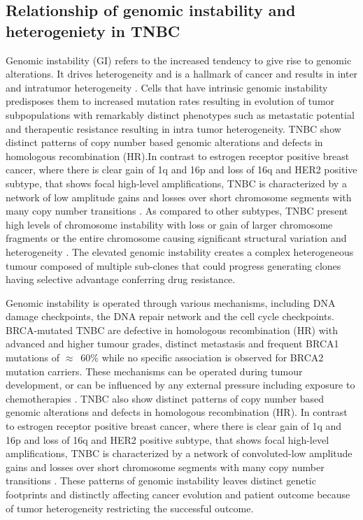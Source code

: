 \subsection{Relationship of genomic instability and heterogeniety in TNBC}
Genomic instability (GI) refers to the increased tendency to give rise to genomic alterations. It drives heterogeneity and is a hallmark of cancer and results in inter and intratumor heterogeneity \cite{hanahan2011hallmarks}.
 Cells that have intrinsic genomic instability predisposes them to increased mutation rates resulting in evolution of tumor subpopulations with remarkably distinct phenotypes such as metastatic potential and therapeutic resistance \cite{fidler1978tumor, burrell2013causes,januvskevivciene2019heterogeneity} resulting in intra tumor heterogeneity. 
TNBC show distinct patterns of copy number based genomic alterations and defects in homologous recombination (HR).In contrast to estrogen receptor positive breast cancer, where there is clear gain of 1q and 16p and loss of 16q and HER2 positive subtype, that shows focal high-level amplifications, TNBC is characterized by a network of low amplitude gains and losses over short chromosome segments with many copy number transitions \cite{kwei2010genomic}.
As compared to other subtypes, TNBC present high levels of chromosome instability with loss or gain of larger chromosome fragments or the entire chromosome causing significant structural variation and heterogeneity \cite{lee2016mechanisms}.
The elevated genomic instability creates a complex heterogeneous tumour composed of multiple sub-clones that could progress generating clones having selective advantage conferring drug resistance. 

Genomic instability is operated through various mechanisms, including DNA damage checkpoints, the DNA repair network and the cell cycle checkpoints. BRCA-mutated TNBC are defective in homologous recombination (HR) with advanced and higher tumour grades, distinct metastasis and frequent BRCA1 mutations of $\approx$~60\% while no specific association is observed for BRCA2 mutation carriers\cite{boyle2012triple, atchley2008clinical}. These mechanisms can be operated during tumour development, or can be influenced by any external pressure including exposure to chemotherapies \cite{burrell2013causes,ding2012clonal,hunter2006hypermutation}.
TNBC also show distinct patterns of copy number based genomic alterations and defects in homologous recombination (HR). In contrast to estrogen receptor positive breast cancer, where there is clear gain of 1q and 16p and loss of 16q and HER2 positive subtype, that shows focal high-level amplifications, TNBC is characterized by a network of convoluted-low amplitude gains and losses over short chromosome segments with many copy number transitions \cite{kwei2010genomic}. These patterns of genomic instability leaves distinct genetic footprints and distinctly affecting cancer evolution and patient outcome because of tumor heterogeneity restricting the successful outcome. 

